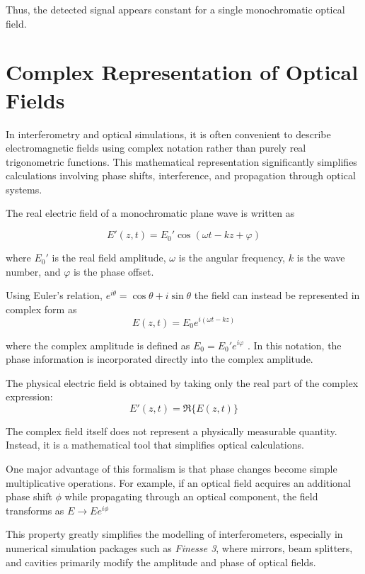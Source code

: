 \documentclass{report}
\begin{document}
Thus, the detected signal appears constant for a single monochromatic optical field.

\section{Complex Representation of Optical Fields}

In interferometry and optical simulations, it is often convenient to describe electromagnetic fields using complex notation rather than purely real trigonometric functions. This mathematical representation significantly simplifies calculations involving phase shifts, interference, and propagation through optical systems.

The real electric field of a monochromatic plane wave is written as

\begin{equation}
E'(z,t)=E_0' \cos(\omega t-kz+\varphi)
\end{equation}

where $E_0'$ is the real field amplitude, $\omega$ is the angular frequency, $k$ is the wave number, and $\varphi$ is the phase offset.

Using Euler's relation,
$e^{i\theta}=\cos\theta+i\sin\theta$
the field can instead be represented in complex form as
\begin{equation}
E(z,t)=E_0 e^{i(\omega t-kz)}
\end{equation}

where the complex amplitude is defined as
$E_0 = E_0' e^{i\varphi}$
. In this notation, the phase information is incorporated directly into the complex amplitude.

The physical electric field is obtained by taking only the real part of the complex expression:
\begin{equation}
E'(z,t)=\Re\{E(z,t)\}
\end{equation}

The complex field itself does not represent a physically measurable quantity. Instead, it is a mathematical tool that simplifies optical calculations.

One major advantage of this formalism is that phase changes become simple multiplicative operations. For example, if an optical field acquires an additional phase shift $\phi$ while propagating through an optical component, the field transforms as
$E \rightarrow E e^{i\phi}$

This property greatly simplifies the modelling of interferometers, especially in numerical simulation packages such as \textit{Finesse 3}, where mirrors, beam splitters, and cavities primarily modify the amplitude and phase of optical fields.
\end{document}

